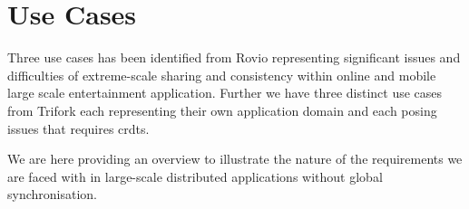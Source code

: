 \section{Use Cases}
Three use cases has been identified from Rovio representing significant issues and difficulties of extreme-scale sharing and consistency within online and mobile large scale entertainment application. Further we have three distinct use cases from Trifork each representing their own application domain and each posing issues that requires \glspl{crdt}.

We are here providing an overview to illustrate the nature of the requirements we are faced with in large-scale distributed applications without global synchronisation.



\ifnum{}
	\newpage
\fi

